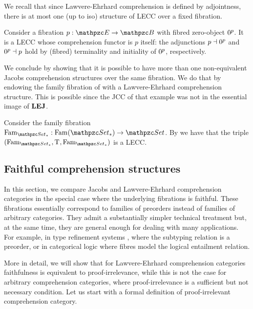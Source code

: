 \documentclass{lmcs} %
\theoremstyle{plain}\newtheorem{satz}[thm]{Satz} %
\begin{document}
			We recall that since Lawvere-Ehrhard comprehension is defined by adjointness, there is at most one (up to iso) structure of LECC over a fixed fibration. 
			
			\begin{exa}\label{prop:obzero}
				Consider a fibration $p:\ct{E}\to\ct{B}$ with fibred zero-object $0^p$. It is a LECC whose comprehension functor is $p$ itself: the adjunctions $p\dashv 0^p$ and $0^p\dashv p$ hold by (fibred) terminality and initiality of $0^p$, respectively.
			\end{exa}
			
			We conclude by showing that it is possible to have more than one non-equivalent Jacobs comprehension structures over the same fibration. We do that by endowing the family fibration of  with a Lawvere-Ehrhard comprehension structure. This is possible since the JCC of that example was not in the essential image of $\mathbf{LEJ}$.
			
			\begin{exa}\label{ex:ourfamsetp}
				Consider the family fibration $\Famfib{\ctsetp}:\Fam{\ctsetp}\to\ctset$. By  we have that the triple $(\Famfib{\ctsetp},\term{},\Famfib{\ctsetp})$ is a LECC.
			\end{exa}
			
			\subsection{Faithful comprehension structures}
			
In this section, we compare Jacobs and Lawvere-Ehrhard comprehension categories in the special case where the underlying fibrations is faithful. 
These fibrations essentially correspond to families of preorders instead of families of arbitrary categories. 
They admit a substantially simpler technical treatment but, at the same time, they are general enough for dealing with many applications. 
For example, in type refinement systems \cite{mellies2015functors}, where the subtyping relation is a preorder, or in categorical logic \cite{lawvere1969adjointness, MR0257175} where fibres model the logical entailment relation. 

More in detail, we will show that for Lawvere-Ehrhard comprehension categories faithfulness is equivalent to proof-irrelevance, while this is not the case for arbitrary comprehension categories, where proof-irrelevance is a sufficient but not necessary condition. 
% 
Let us start with a formal definition of proof-irrelevant comprehension category.
\end{document}
